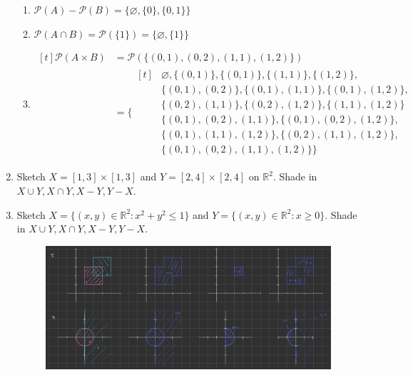 \documentclass[10pt]{article}
\newcommand{\R}{\mathbb{R}}
\theoremstyle{definition}
\begin{document}
\begin{enumerate}
\begin{enumerate}[label=(\alph*)]
                \item $\mathscr{P}(A) - \mathscr{P}(B) = \{\varnothing,\{0\},\{0,1\}\}$
                \item $\mathscr{P}(A \cap B) = \mathscr{P}(\{1\}) = \{\varnothing, \{1\}\}$
                \item $
                    \begin{aligned}[t]
                        \mathscr{P}(A \times B) &= \mathscr{P}(\{(0,1),(0,2),(1,1),(1,2)\}) \\
                        &= \{
                            \begin{aligned}[t]
                                &\varnothing,\{(0,1)\},\{(0,1)\},\{(1,1)\},\{(1,2)\},\\
                                &\{(0,1),(0,2)\},\{(0,1),(1,1)\},\{(0,1),(1,2)\},\\
                                &\{(0,2),(1,1)\},\{(0,2),(1,2)\},\{(1,1),(1,2)\}\\
                                &\{(0,1),(0,2),(1,1)\},\{(0,1),(0,2),(1,2)\},\\
                                &\{(0,1),(1,1),(1,2)\},\{(0,2),(1,1),(1,2)\},\\
                                &\{(0,1),(0,2),(1,1),(1,2)\}
                            \}
                        \end{aligned}
                    \end{aligned}
                    $
            \end{enumerate}
        \item Sketch $X = [1,3] \times [1,3]$ and $Y = [2,4] \times [2,4]$ on $\R^2$. Shade in $X \cup Y, X \cap Y, X-Y, Y-X$.
        \item Sketch $X = \{(x,y)\in\R^2:x^2 + y^2\leq1\}$ and $Y = \{(x,y)\in\R^2:x\geq0\}$. Shade in $X \cup Y, X \cap Y, X-Y, Y-X$.
            \begin{figure}
                \centering
                \includegraphics[width=0.75\linewidth]{images/exercise_1_5.png}

\end{figure}
\end{enumerate}
\end{document}
